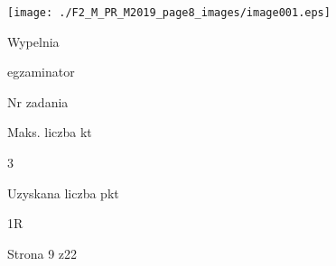 \documentclass[a4paper,12pt]{article}
\begin{document}
\begin{center}
\texttt{[image: ./F2\_M\_PR\_M2019\_page8\_images/image001.eps]}
\end{center}
Wypelnia

egzaminator

Nr zadania

Maks. liczba kt

3

Uzyskana liczba pkt

1R

Strona 9 z22
\end{document}
